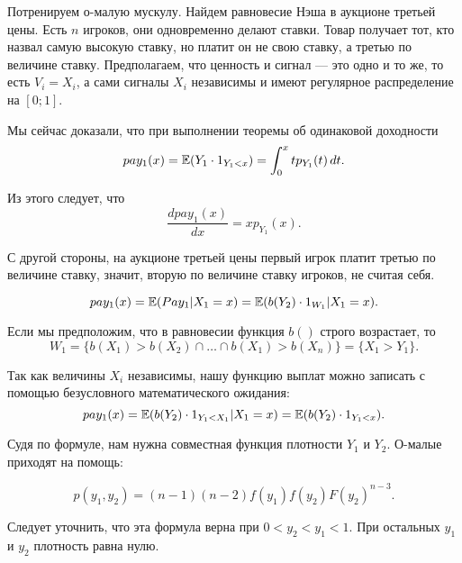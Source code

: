 \begin{myex} Потренируем о-малую мускулу. Найдем равновесие Нэша в аукционе третьей цены. Есть $ n $ игроков, они одновременно делают ставки. Товар получает тот, кто назвал самую высокую ставку, но платит он не свою ставку, а третью по величине ставку. Предполагаем, что ценность и сигнал — это одно и то же, то есть $ V_{i}=X_{i} $, а сами сигналы $ X_{i} $ независимы и имеют регулярное распределение на $ [0;1] $.


Мы сейчас доказали, что при выполнении теоремы об одинаковой доходности
\begin{equation}
pay_{1}(x)=\operatorname{\mathbb{E}}(Y_{1}\cdot 1_{Y_{1}<x})=\int_{0}^{x}tp_{Y_{1}}(t) \, dt.
\end{equation}

Из этого следует, что
\begin{equation}
\frac{dpay_{1}(x)}{dx}=xp_{Y_{1}}(x).
\end{equation}


С другой стороны, на аукционе третьей цены первый игрок платит третью по величине ставку, значит, вторую по величине ставку игроков, не считая себя.

\begin{equation}
pay_{1}(x)=\operatorname{\mathbb{E}}(Pay_{1}|X_{1}=x)=\operatorname{\mathbb{E}}(b(Y_{2})\cdot 1_{W_{1}}|X_{1}=x).
\end{equation}

Если мы предположим, что в равновесии функция $ b() $ строго возрастает, то
\begin{equation}
W_{1}=\{b(X_{1})>b(X_{2})\cap \ldots\cap  b(X_{1})>b(X_{n})\}=\{X_{1}>Y_{1}\}.
\end{equation}

Так как величины $ X_{i} $ независимы, нашу функцию выплат можно записать с помощью безусловного математического ожидания:
\begin{equation}
pay_{1}(x)=\operatorname{\mathbb{E}}(b(Y_{2})\cdot 1_{Y_{1}<X_{1}}|X_{1}=x)=\operatorname{\mathbb{E}}(b(Y_{2})\cdot 1_{Y_{1}<x}).
\end{equation}

Судя по формуле, нам нужна совместная функция плотности $ Y_{1} $ и $ Y_{2} $. О-малые приходят на помощь:

\begin{equation}
p(y_{1},y_{2})=(n-1)(n-2)f(y_{1})f(y_{2})F(y_{2})^{n-3}.
\end{equation}

Следует уточнить, что эта формула верна при $0<y_{2}<y_{1}<1$. При остальных $ y_{1} $ и $ y_{2} $ плотность равна нулю.


\end{myex}
